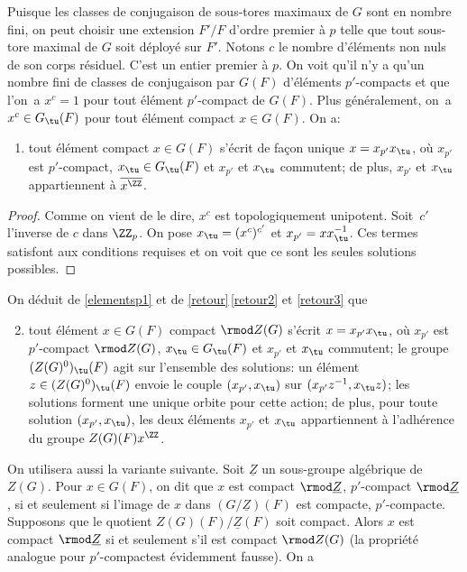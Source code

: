 Puisque les classes de conjugaison de sous-tores maximaux de $G$ sont en nombre fini, on peut choisir une extension $F'/F$ d'ordre premier à $p$ telle que tout sous-tore maximal de $G$ soit déployé sur $F'$. Notons $c$ le nombre d'éléments non nuls de son corps résiduel. C'est un entier premier à $p$. On voit
qu'il n'y a qu'un nombre fini de classes de conjugaison par $G(F)$ d'éléments $p'$-compacts et que l'on~a $x^c=1$ pour tout élément $p'$-compact de $G(F)$. Plus généralement, on~a $x^c\in G_{\tu}(F)$ pour tout élément compact $x\in G(F)$. On a:
\begin{enumerate}
\item\label{elementsp1}
tout élément compact $x\in G(F)$ s'écrit de façon unique $x=x_{p'}x_{\tu}$, où $x_{p'}$ est $p'$-compact, $x_{\tu}\in G_{\tu}(F)$ et $x_{p'}$ et $x_{\tu}$ commutent; de plus, $x_{p'}$ et $x_{\tu}$ appartiennent à $\overline{x^{\ZZ}}$.
\end{enumerate}

\begin{proof}
Comme on vient de le dire, $x^c$ est topologiquement unipotent. Soit~$c'$ l'inverse de $c$ dans $\ZZ_{p}$. On pose $x_{\tu}=(x^c)^{c'}$ et $x_{p'}=xx_{\tu}^{-1}$. Ces termes satisfont aux conditions requises et on voit que ce sont les seules solutions possibles.
\end{proof}

On déduit de \eqref{elementsp1} et de \ref{retour}\,\eqref{retour2} et \eqref{retour3} que
\begin{enumerate}\setcounter{enumi}{1}
\item\label{elementsp2}
tout élément $x\in G(F)$ compact $\rmod Z(G)$ s'écrit $x=x_{p'}x_{\tu}$, où $x_{p'}$ est $p'$\nobreakdash-compact $\rmod Z(G)$, $x_{\tu}\in G_{\tu}(F)$ et $x_{p'}$ et $x_{\tu}$ commutent; le groupe $(Z(G)^0)_{\tu}(F)$ agit sur l'ensemble des solutions: un élément $z\in (Z(G)^0)_{\tu}(F)$ envoie le couple $(x_{p'},x_{\tu})$ sur $(x_{p'}z^{-1},x_{\tu}z)$; les solutions forment une unique orbite pour cette action; de plus, pour toute solution $(x_{p'},x_{\tu})$, les deux éléments $x_{p'}$ et $x_{\tu}$ appartiennent à l'adhérence du groupe $Z(G)(F)x^\ZZ$.
\end{enumerate}

On utilisera aussi la variante suivante. Soit $\underline{Z}$ un sous-groupe algébrique de $Z(G)$. Pour $x\in G(F)$, on dit que $x$ est compact $\rmod \underline{Z}$, \resp $p'$-compact $\rmod \underline{Z}$, si et seulement si l'image de $x$ dans $(G/\underline{Z})(F)$ est compacte, \resp $p'$-compacte. Supposons que le quotient $Z(G)(F)/\underline{Z}(F)$ soit compact. Alors $x$ est compact $\rmod \underline{Z}$ si et seulement s'il est compact $\rmod Z(G)$ (la propriété analogue pour \og $p'$-compact\fg est évidemment fausse). On a

